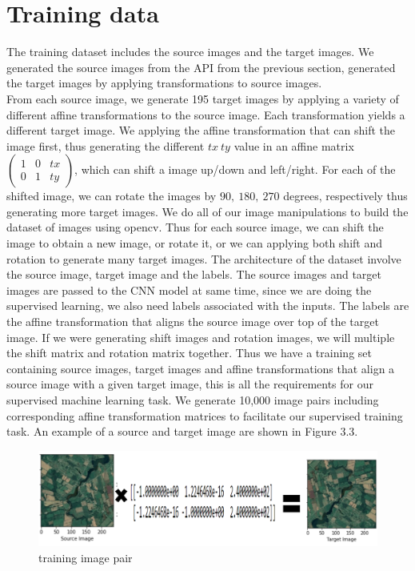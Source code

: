 \section{Training data}
The training dataset includes the source images and the target images. We generated the source images from the API from the previous section, generated the target images by applying transformations to source images.\\
  From each source image, we generate 195 target images by applying a variety of different affine transformations to the source image. Each transformation yields a different target image. We applying the affine transformation that can shift the image first, thus generating the different $tx\ ty$ value in an affine matrix $\begin{pmatrix}
 1 & 0 & tx \\
 0 & 1 & ty
 \end{pmatrix}$, which can shift a image up/down and left/right. For each of the shifted image, we can rotate the images by $ 90,\ 180,\ 270$ degrees, respectively thus generating more target images. We do all of our image manipulations to build the dataset of images using opencv\cite{bradski2000opencv}. Thus for each source image, we can shift the image to obtain a new image, or rotate it, or we can applying both shift and rotation to generate many target images. The architecture of the dataset involve the source image, target image and the  labels. 
 The source images and target images are passed to the CNN model at same time, since we are doing the supervised learning, we also need labels associated with the inputs. The labels are the affine transformation that aligns the source image over top of the target image. If we were generating shift images and rotation images, we will multiple the shift matrix and rotation matrix together. Thus we have a training set containing source images, target images and affine transformations that align a source image with a given target image, this is all the requirements for our supervised machine learning task. We generate 10,000 image pairs including corresponding affine transformation matrices to facilitate our supervised training task. An example of a source and target image are shown in Figure 3.3.

 
\begin{figure}
\centering
\includegraphics[width = 4.5in]{figs/source_target}
\caption{training image pair}
\end{figure}


